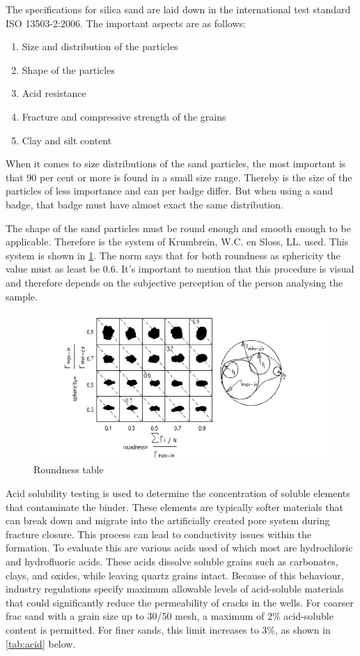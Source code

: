 The specifications for silica sand are laid down in the international test standard ISO 13503-2:2006. The important aspects are as follows:

\begin{enumerate}
    \item  Size and distribution of the particles
    \item Shape of the particles
    \item Acid resistance 
    \item Fracture and compressive strength of the grains
    \item Clay and silt content
\end{enumerate}

When it comes to size distributions of the sand particles, the most important is that 90 per cent or more is found in a small size range. Thereby is the size of the particles of less importance and can per badge differ. But when using a sand badge, that badge must have almost exact the same distribution. 

The shape of the sand particles must be round enough and smooth enough to be applicable. Therefore is the system of Krumbrein, W.C. en Sloss, LL. used. This system is shown in \ref{fig:RT}. The norm says that for both roundness as sphericity the value must as least be 0.6. It's important to mention that this procedure is visual and therefore depends on the subjective perception of the person analysing the sample.

\begin{figure}[H]
    \centering
    \includegraphics[width=0.75\linewidth]{figures//ch9/roundness.png}
    \caption{Roundness table \autocite{rodriguezParticleShapeQuantities2013}}
    \label{fig:RT}
\end{figure}

Acid solubility testing is used to determine the concentration of soluble elements that contaminate the binder. These elements are typically softer materials that can break down and migrate into the artificially created pore system during fracture closure. This process can lead to conductivity issues within the formation.
To evaluate this are various acids  used of which most are hydrochloric and hydrofluoric acids. These acids dissolve soluble grains such as carbonates, clays, and oxides, while leaving quartz grains intact. Because of this behaviour, industry regulations specify maximum allowable levels of acid-soluble materials that could significantly reduce the permeability of cracks in the wells.
For coarser frac sand with a grain size up to 30/50 mesh, a maximum of 2\% acid-soluble content is permitted. For finer sands, this limit increases to 3\%, as shown in \ref{tab:acid} below.

